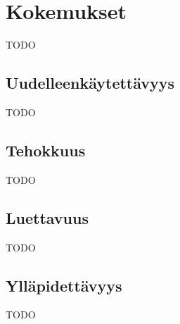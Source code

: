 \vspace{21.5pt}
\chapter{Kokemukset}
TODO

\section{Uudelleenkäytettävyys}
TODO
\section{Tehokkuus}
TODO
\section{Luettavuus}
TODO
\section{Ylläpidettävyys}
TODO